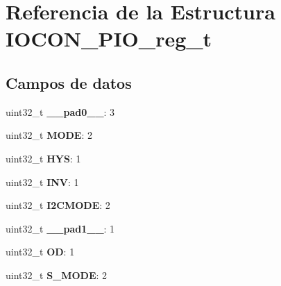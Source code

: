 \hypertarget{structIOCON__PIO__reg__t}{}\section{Referencia de la Estructura I\+O\+C\+O\+N\+\_\+\+P\+I\+O\+\_\+reg\+\_\+t}
\label{structIOCON__PIO__reg__t}
\subsection*{Campos de datos}
\begin{DoxyCompactItemize}
\item 
\mbox{\label{structIOCON__PIO__reg__t_aa8887a399e416c1f376c227ab1b38ffd}} 
uint32\+\_\+t {\bfseries \+\_\+\+\_\+pad0\+\_\+\+\_\+}\+: 3
\item 
\mbox{\label{structIOCON__PIO__reg__t_a0560156948d57ae1f2b0c37314462ad4}} 
uint32\+\_\+t {\bfseries M\+O\+DE}\+: 2
\item 
\mbox{\label{structIOCON__PIO__reg__t_a45be45effa1b48ba33eb948051e2a1ac}} 
uint32\+\_\+t {\bfseries H\+YS}\+: 1
\item 
\mbox{\label{structIOCON__PIO__reg__t_a9bbf121550114db07090cdb5cbafed7e}} 
uint32\+\_\+t {\bfseries I\+NV}\+: 1
\item 
\mbox{\label{structIOCON__PIO__reg__t_a747672ef38d052e84152d871d00fd35f}} 
uint32\+\_\+t {\bfseries I2\+C\+M\+O\+DE}\+: 2
\item 
\mbox{\label{structIOCON__PIO__reg__t_a34c61348e3b3e08a5162c04a30d50515}} 
uint32\+\_\+t {\bfseries \+\_\+\+\_\+pad1\+\_\+\+\_\+}\+: 1
\item 
\mbox{\label{structIOCON__PIO__reg__t_aa9f648c8f429700919647836a4f8285c}} 
uint32\+\_\+t {\bfseries OD}\+: 1
\item 
\mbox{\label{structIOCON__PIO__reg__t_a6d9314af10b72ebe0118edb7f0f9d262}} 
uint32\+\_\+t {\bfseries S\+\_\+\+M\+O\+DE}\+: 2
\item 

\end{DoxyCompactItemize}
